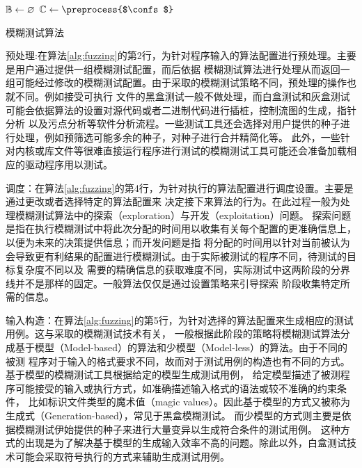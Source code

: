 \documentclass[bachelor]{njupthesis}
\begin{document}
\begin{algorithm}[H]
	\KwIn{\confs, \timeout}
	$\mathbb{B} \gets \varnothing$\;
	$\confs \gets \preprocess{$\confs$}$\;
	\Return{\bugs}\;
	\caption[short]{模糊测试算法}\label{alg:fuzzing} 
\end{algorithm} 
\vspace{6pt}
预处理:在算法\ref{alg:fuzzing}的第2行，为针对程序输入的算法配置进行预处理。主要是用户通过提供一组模糊测试配置，而后依据
模糊测试算法进行处理从而返回一组可能经过修改的模糊测试配置。由于采取的模糊测试策略不同，预处理的操作也就不同。例如接受可执行
文件的黑盒测试一般不做处理，而白盒测试和灰盒测试可能会依据算法的设置对源代码或者二进制代码进行插桩，控制流图的生成，指针分析
以及污点分析等软件分析流程。一些测试工具还会选择对用户提供的种子进行处理，例如预筛选可能多余的种子，对种子进行合并精简化等。
此外，一些针对内核或库文件等很难直接运行程序进行测试的模糊测试工具可能还会准备加载相应的驱动程序用以测试。

调度：在算法\ref{alg:fuzzing}的第4行，为针对执行的算法配置进行调度设置。主要是通过更改或者选择特定的算法配置来
决定接下来算法的行为。在此过程一般为处理模糊测试算法中的探索（exploration）与开发（exploitation）问题。
探索问题是指在执行模糊测试中将此次分配的时间用以收集有关每个配置的更准确信息上，以便为未来的决策提供信息；而开发问题是指
将分配的时间用以针对当前被认为会导致更有利结果的配置进行模糊测试。由于实际被测试的程序不同，待测试的目标复杂度不同以及
需要的精确信息的获取难度不同，实际测试中这两阶段的分界线并不是那样的固定。一般算法仅仅是通过设置策略来引导探索
阶段收集特定所需的信息。

输入构造：在算法\ref{alg:fuzzing}的第5行，为针对选择的算法配置来生成相应的测试用例。这与采取的模糊测试技术有关，
一般根据此阶段的策略将模糊测试算法分成基于模型（Model-based）的算法和少模型（Model-less）的算法。由于不同的被测
程序对于输入的格式要求不同，故而对于测试用例的构造也有不同的方式。基于模型的模糊测试工具根据给定的模型生成测试用例，
给定模型描述了被测程序可能接受的输入或执行方式，如准确描述输入格式的语法或较不准确的约束条件，
比如标识文件类型的魔术值（magic values）。因此基于模型的方式又被称为生成式（Generation-based），常见于黑盒模糊测试。
而少模型的方式则主要是依据模糊测试伊始提供的种子来进行大量变异以生成符合条件的测试用例。
这种方式的出现是为了解决基于模型的生成输入效率不高的问题。除此以外，白盒测试技术可能会采取符号执行的方式来辅助生成测试用例。
\end{document}
